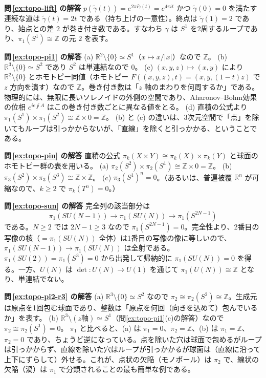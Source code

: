 \documentclass[uplatex, dvipdfmx, book]{jsbook}
\newcommand{\exsol}[1]{\par\medskip\noindent\textbf{問\,\ref{#1} の解答}\quad}
\begin{document}
\exsol{ex:topo-lift}
$p(\tilde{\gamma}(t)) = e^{2\pi i \tilde{\gamma}(t)} = e^{4\pi i t}$ かつ $\tilde{\gamma}(0) = 0$ を満たす連続な道は $\tilde{\gamma}(t) = 2t$ である（持ち上げの一意性）。終点は $\tilde{\gamma}(1) = 2$ であり、始点との差 $2$ が巻き付き数である。すなわち $\gamma$ は $S^1$ を2周するループであり、$\pi_1(S^1) \cong \mathbb{Z}$ の元 $2$ を表す。

\exsol{ex:topo-pi1}
(a) $\mathbb{R}^2 \setminus \{0\} \simeq S^1$（$x \mapsto x/|x|$）なので $\mathbb{Z}$。
(b) $\mathbb{R}^3 \setminus \{0\} \simeq S^2$ であり $S^2$ は単連結なので $0$。
(c) $(x, y, z) \mapsto (x, y)$ により $\mathbb{R}^2 \setminus \{0\}$ とホモトピー同値（ホモトピー $F((x, y, z), t) = (x, y, (1 - t)z)$ で $z$ 方向を潰す）なので $\mathbb{Z}$。巻き付き数は「$z$ 軸のまわりを何周するか」である。物理的には、無限に長いソレノイドの外側の空間であり、Aharonov--Bohm効果の位相 $e^{ie\oint A}$ はこの巻き付き数ごとに異なる値をとる。
(d) 直積の公式より $\pi_1(S^1) \times \pi_1(S^2) \cong \mathbb{Z} \times 0 = \mathbb{Z}$。
(b) と (c) の違いは、3次元空間で「点」を除いてもループは引っかからないが、「直線」を除くと引っかかる、ということである。

\exsol{ex:topo-pin}
直積の公式 $\pi_k(X \times Y) \cong \pi_k(X) \times \pi_k(Y)$ と球面のホモトピー群の表を用いる。
(a) $\pi_2(S^2) \times \pi_2(S^1) \cong \mathbb{Z} \times 0 = \mathbb{Z}$。
(b) $\pi_3(S^2) \times \pi_3(S^3) \cong \mathbb{Z} \times \mathbb{Z}$。
(c) $\pi_3(S^1)^n = 0$。（あるいは、普遍被覆 $\mathbb{R}^n$ が可縮なので、$k \ge 2$ で $\pi_k(T^n) = 0$。）

\exsol{ex:topo-sun}
完全列の該当部分は
\begin{equation*}
    \pi_1(SU(N-1)) \to \pi_1(SU(N)) \to \pi_1(S^{2N-1})
\end{equation*}
である。$N \ge 2$ では $2N - 1 \ge 3$ なので $\pi_1(S^{2N-1}) = 0$。完全性より、2番目の写像の核（$=\pi_1(SU(N))$ 全体）は1番目の写像の像に等しいので、$\pi_1(SU(N-1)) \to \pi_1(SU(N))$ は全射である。$\pi_1(SU(2)) = \pi_1(S^3) = 0$ から出発して帰納的に $\pi_1(SU(N)) = 0$ を得る。一方、$U(N)$ は $\det: U(N) \to U(1)$ を通じて $\pi_1(U(N)) \cong \mathbb{Z}$ となり、単連結でない。

\exsol{ex:topo-pi2-r3}
(a) $\mathbb{R}^3 \setminus \{0\} \simeq S^2$ なので $\pi_2 \cong \pi_2(S^2) \cong \mathbb{Z}$。生成元は原点を1回包む球面であり、整数は「原点を何回（向きを込めて）包んでいるか」を表す。
(b) $\mathbb{R}^3 \setminus (z\text{軸}) \simeq S^1$（問\ref{ex:topo-pi1}(c)の解答）なので $\pi_2 \cong \pi_2(S^1) = 0$。
$\pi_1$ と比べると、(a) は $\pi_1 = 0$、$\pi_2 = \mathbb{Z}$、(b) は $\pi_1 = \mathbb{Z}$、$\pi_2 = 0$ であり、ちょうど逆になっている。点を除いた穴は球面で包めるがループは引っかからず、直線を除いた穴はループが引っかかるが球面は（直線に沿って上下にずらして）外せる。これが、点状の欠陥（モノポール）は $\pi_2$ で、線状の欠陥（渦）は $\pi_1$ で分類されることの最も簡単な例である。
\end{document}
